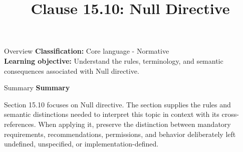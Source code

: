\documentclass[10pt,letterpaper]{article}
\title{Clause 15.10: Null Directive}
\author{}
\date{}
\begin{document}
\maketitle
\begin{CornellOverviewBox}{Overview}
\textbf{Classification:} Core language - Normative\\[2pt]
\textbf{Learning objective:} Understand the rules, terminology, and semantic consequences associated with Null directive.
\end{CornellOverviewBox}\begin{CornellSummaryBox}{Summary}
{\sffamily\bfseries\color{Accent} Summary}\par\vspace{3pt}Section 15.10 focuses on Null directive. The section supplies the rules and semantic distinctions needed to interpret this topic in context with its cross-references. When applying it, preserve the distinction between mandatory requirements, recommendations, permissions, and behavior deliberately left undefined, unspecified, or implementation-defined.
\end{CornellSummaryBox}
\end{document}

